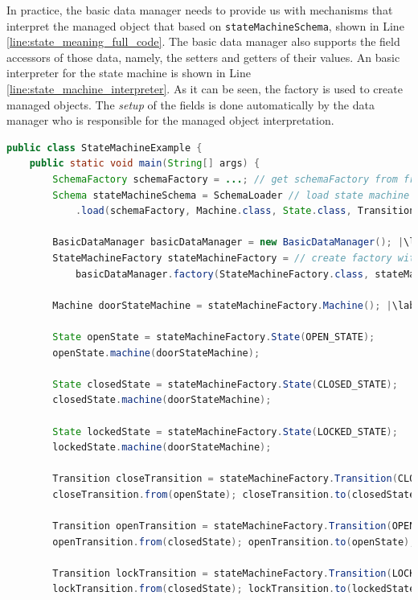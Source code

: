 In practice, the basic data manager needs to provide us with mechanisms that interpret the managed object that based on \texttt{stateMachineSchema}, shown in Line \ref{line:state_meaning_full_code}.
The basic data manager  also supports the field accessors of those data, namely, the setters and getters of their values.
An basic interpreter for the state machine is shown in Line \ref{line:state_machine_interpreter}.
As it can be seen, the factory is used to create managed objects.
The \textit{setup} of the fields is done automatically by the data manager who is responsible for the managed object interpretation.

\begin{sourcecode}
	\begin{lstlisting}[language=Java, escapechar=|]
public class StateMachineExample {
	public static void main(String[] args) {
		SchemaFactory schemaFactory = ...; // get schemaFactory from framework
		Schema stateMachineSchema = SchemaLoader // load state machine schema
			.load(schemaFactory, Machine.class, State.class, Transition.class); |\label{line:state_schemaMachineSchema}|

		BasicDataManager basicDataManager = new BasicDataManager(); |\label{line:state_meaning_full_code}|
		StateMachineFactory stateMachineFactory = // create factory with data manager
			basicDataManager.factory(StateMachineFactory.class, stateMachineSchema);

		Machine doorStateMachine = stateMachineFactory.Machine(); |\label{line:state_machine_creation_basic}|

		State openState = stateMachineFactory.State(OPEN_STATE);
		openState.machine(doorStateMachine);

		State closedState = stateMachineFactory.State(CLOSED_STATE);
		closedState.machine(doorStateMachine);

		State lockedState = stateMachineFactory.State(LOCKED_STATE);
		lockedState.machine(doorStateMachine);

		Transition closeTransition = stateMachineFactory.Transition(CLOSE_TRANSITION);
		closeTransition.from(openState); closeTransition.to(closedState);

		Transition openTransition = stateMachineFactory.Transition(OPEN_TRANSITION);
		openTransition.from(closedState); openTransition.to(openState);

		Transition lockTransition = stateMachineFactory.Transition(LOCK_TRANSITION);
		lockTransition.from(closedState); lockTransition.to(lockedState);


\end{lstlisting}
\end{sourcecode}
